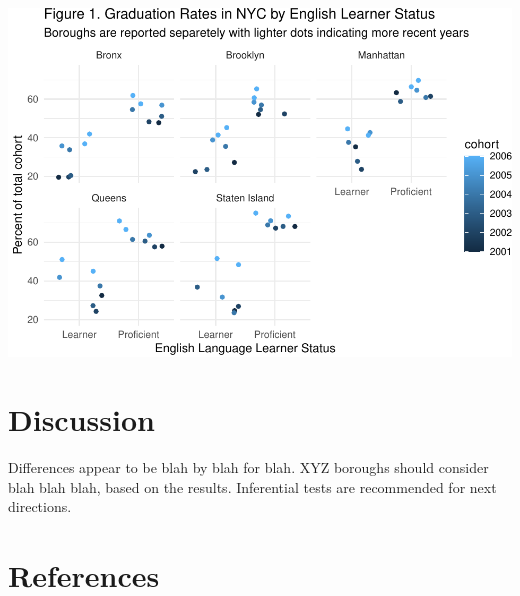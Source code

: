 \documentclass[
  english,
  man, fleqn, noextraspace]{apa6}
\begin{document}
\includegraphics{EDLD_651_Final_Project_Draft_files/figure-latex/graph_results-1.pdf}

\hypertarget{discussion}{%
\section{Discussion}\label{discussion}}

Differences appear to be blah by blah for blah. XYZ boroughs should consider blah blah blah, based on the results. Inferential tests are recommended for next directions.

\newpage

\hypertarget{references}{%
\section{References}\label{references}}

\begingroup
\setlength{\parindent}{-0.5in}
\setlength{\leftskip}{0.5in}

\hypertarget{refs}{}

\endgroup
\end{document}
